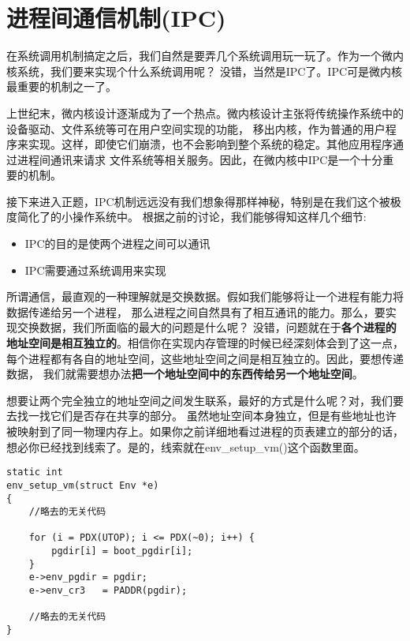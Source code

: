 \section{进程间通信机制(IPC)}
在系统调用机制搞定之后，我们自然是要弄几个系统调用玩一玩了。作为一个微内核系统，我们要来实现个什么系统调用呢？
没错，当然是IPC了。IPC可是微内核最重要的机制之一了。

\begin{note}
上世纪末，微内核设计逐渐成为了一个热点。微内核设计主张将传统操作系统中的设备驱动、文件系统等可在用户空间实现的功能，
移出内核，作为普通的用户程序来实现。这样，即使它们崩溃，也不会影响到整个系统的稳定。其他应用程序通过进程间通讯来请求
文件系统等相关服务。因此，在微内核中IPC是一个十分重要的机制。
\end{note}

接下来进入正题，IPC机制远远没有我们想象得那样神秘，特别是在我们这个被极度简化了的小操作系统中。
根据之前的讨论，我们能够得知这样几个细节:

\begin{itemize}
  \item IPC的目的是使两个进程之间可以通讯
  \item IPC需要通过系统调用来实现
\end{itemize}

所谓通信，最直观的一种理解就是交换数据。假如我们能够将让一个进程有能力将数据传递给另一个进程，
那么进程之间自然具有了相互通讯的能力。那么，要实现交换数据，我们所面临的最大的问题是什么呢？
没错，问题就在于\textbf{各个进程的地址空间是相互独立的}。相信你在实现内存管理的时候已经深刻体会到了这一点，
每个进程都有各自的地址空间，这些地址空间之间是相互独立的。因此，要想传递数据，
我们就需要想办法\textbf{把一个地址空间中的东西传给另一个地址空间}。

想要让两个完全独立的地址空间之间发生联系，最好的方式是什么呢？对，我们要去找一找它们是否存在共享的部分。
虽然地址空间本身独立，但是有些地址也许被映射到了同一物理内存上。如果你之前详细地看过进程的页表建立的部分的话，
想必你已经找到线索了。是的，线索就在env\_setup\_vm()这个函数里面。

\begin{verbatim}
static int
env_setup_vm(struct Env *e)
{
    //略去的无关代码

    for (i = PDX(UTOP); i <= PDX(~0); i++) {
        pgdir[i] = boot_pgdir[i];
    }
    e->env_pgdir = pgdir;
    e->env_cr3   = PADDR(pgdir);

    //略去的无关代码
}
\end{verbatim}

